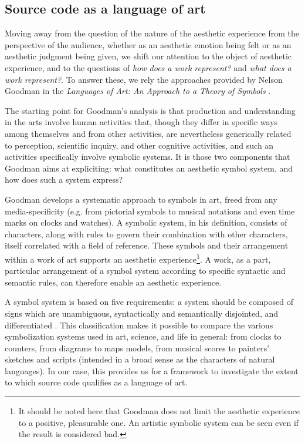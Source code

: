 \subsection{Source code as a language of art}
\label{subsec:source-code-language-art}

Moving away from the question of the nature of the aesthetic experience from the perspective of the audience, whether as an aesthetic emotion being felt or as an aesthetic judgment being given, we shift our attention to the object of aesthetic experience, and to the questions of \emph{how does a work represent?} and \emph{what does a work represent?}. To answer these, we rely the approaches provided by Nelson Goodman in the \emph{Languages of Art: An Approach to a Theory of Symbols} \citep{goodman_languages_1976}.

The starting point for Goodman's analysis is that production and understanding in the arts involve human activities that, though they differ in specific ways among themselves and from other activities, are nevertheless generically related to perception, scientific inquiry, and other cognitive activities, and such an activities specifically involve symbolic systems. It is those two components that Goodman aims at expliciting: what constitutes an aesthetic symbol system, and how does such a system express?

Goodman develops a systematic approach to symbols in art, freed from any media-specificity (e.g. from pictorial symbols to musical notations and even time marks on clocks and watches). A symbolic system, in his definition, consists of characters, along with rules to govern their combination with other characters, itself correlated with a field of reference. These symbols and their arrangement within a work of art supports an aesthetic experience\footnote{It should be noted here that Goodman does not limit the aesthetic experience to a positive, pleasurable one. An artistic symbolic system can be seen even if the result is considered bad.}. A work, as a part, particular arrangement of a symbol system according to specific syntactic and semantic rules, can therefore enable an aesthetic experience.

A symbol system is based on five requirements: a system should be composed of signs which are unambiguous, syntactically and semantically disjointed, and differentiated \citep{goodman_languages_1976}. This classification makes it possible to compare the various symbolization systems used in art, science, and life in general: from clocks to counters, from diagrams to maps models, from musical scores to painters' sketches and scripts (intended in a broad sense as the characters of natural languages). In our case, this provides us for a framework to investigate the extent to which source code qualifies as a language of art.

